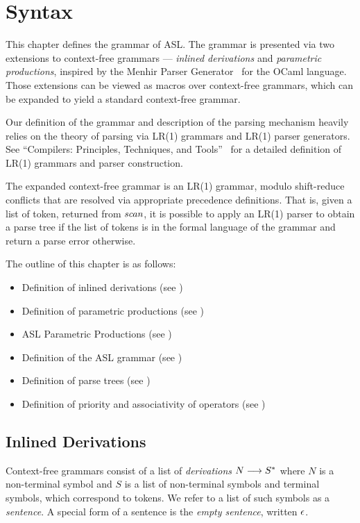 \chapter{Syntax\label{chap:Syntax}}

This chapter defines the grammar of ASL. The grammar is presented via two extensions
to context-free grammars --- \emph{inlined derivations} and \emph{parametric productions},
inspired by the Menhir Parser Generator~\cite{MenhirManual} for the OCaml language.
Those extensions can be viewed as macros over context-free grammars, which can be
expanded to yield a standard context-free grammar.

Our definition of the grammar and description of the parsing mechanism heavily relies
on the theory of parsing via LR(1) grammars and LR(1) parser generators.
%
See ``Compilers: Principles, Techniques, and Tools''~\cite{ASU86} for a detailed
definition of LR(1) grammars and parser construction.

The expanded context-free grammar is an LR(1) grammar, modulo shift-reduce
conflicts that are resolved via appropriate precedence definitions.
That is, given a list of token, returned from $\textit{scan}$, it is possible to apply
an LR(1) parser to obtain a parse tree if the list of tokens is in the formal language
of the grammar and return a parse error otherwise.

The outline of this chapter is as follows:
\begin{itemize}
  \item Definition of inlined derivations (see )
  \item Definition of parametric productions (see )
  \item ASL Parametric Productions (see )
  \item Definition of the ASL grammar (see )
  \item Definition of parse trees (see )
  \item Definition of priority and associativity of operators (see )
\end{itemize}

\section{Inlined Derivations \label{sec:InlinedDerivations}}
Context-free grammars consist of a list of \emph{derivations} $N \longrightarrow S^*$
where $N$ is a non-terminal symbol and $S$ is a list of non-terminal symbols and terminal symbols,
which correspond to tokens.
We refer to a list of such symbols as a \emph{sentence}.
A special form of a sentence is the \emph{empty sentence}, written $\epsilon$.

